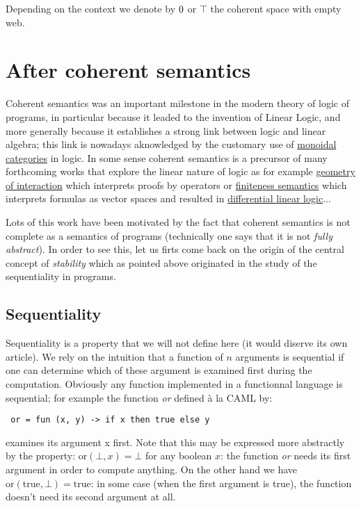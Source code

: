 Depending on the context we denote by \(0\) or \(\top\) the coherent
space with empty web.

\section{After coherent semantics}\label{after-coherent-semantics}

Coherent semantics was an important milestone in the modern theory of
logic of programs, in particular because it leaded to the invention of
Linear Logic, and more generally because it establishes a strong link
between logic and linear algebra; this link is nowadays aknowledged by
the customary use of \href{Categorical_semantics}{monoidal categories}
in logic. In some sense coherent semantics is a precursor of many
forthcoming works that explore the linear nature of logic as for example
\href{geometry_of_interaction}{geometry of interaction} which interprets
proofs by operators or \href{finiteness_semantics}{finiteness semantics}
which interprets formulas as vector spaces and resulted in
\href{differential_linear_logic}{differential linear logic}...

Lots of this work have been motivated by the fact that coherent
semantics is not complete as a semantics of programs (technically one
says that it is not \emph{fully abstract}). In order to see this, let us
firts come back on the origin of the central concept of \emph{stability}
which as pointed above originated in the study of the sequentiality in
programs.

\subsection{Sequentiality}\label{sequentiality}

Sequentiality is a property that we will not define here (it would
diserve its own article). We rely on the intuition that a function of
\(n\) arguments is sequential if one can determine which of these
argument is examined first during the computation. Obviously any
function implemented in a functionnal language is sequential; for
example the function \emph{or} defined à la CAML by:

\texttt{~or\ =\ fun\ (x,\ y)\ -\textgreater{}\ if\ x\ then\ true\ else\ y}

examines its argument x first. Note that this may be expressed more
abstractly by the property: \(\mathrm{or}(\bot, x) = \bot\) for any
boolean \(x\): the function \emph{or} needs its first argument in order
to compute anything. On the other hand we have
\(\mathrm{or}(\mathrm{true}, \bot) = \mathrm{true}\): in some case (when
the first argument is true), the function doesn't need its second
argument at all.

